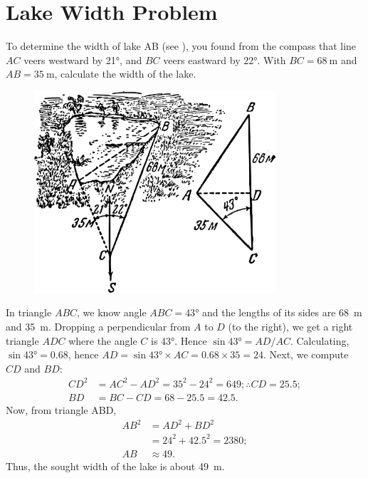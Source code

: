 \section{Lake Width Problem}
\label{sec-5.6}

To determine the width of lake AB (see ), you found from the compass that line $AC$ veers westward by \ang{21}, and $BC$ veers eastward by \ang{22}. With $BC = \SI{68}{\meter}$ and $AB = \SI{35}{\meter}$, calculate the width of the lake.

\begin{figure}[h!]
\centering
\includegraphics[width=0.8\textwidth]{figures/ch-05/fig-094.pdf}
\end{figure}

\ans In triangle $ABC$, we know angle $ABC = \ang{43}$ and the lengths of its sides are \SI{68}{\meter} and \SI{35}{\meter}. Dropping a perpendicular from $A$ to $D$ (to the right), we get a right triangle $ADC$ where the angle $C$ is \ang{43}. Hence $\sin \ang{43} = AD/AC$. Calculating, $\sin \ang{43} = 0.68$, hence $AD = \sin \ang{43} \times AC  = 0.68 \times 35 = 24$. Next, we compute $CD$ and $BD$: 
\begin{align*}%
CD^{2} & = AC^{2} - AD^{2} = 35^{2} - 24^{2} = 649; \therefore CD = 25.5;\\
BD & = BC - CD =  68 - 25.5 = 42.5. 
\end{align*}
Now, from triangle ABD, 
\begin{align*}%
AB^{2} & = AD^{2} + B{D}^2 \\
& = 24^{2} + 42.5^{2} = 2380;\\
AB & \approx 49.
\end{align*}
Thus, the sought width of the lake is about \SI{49}{\meter}.

